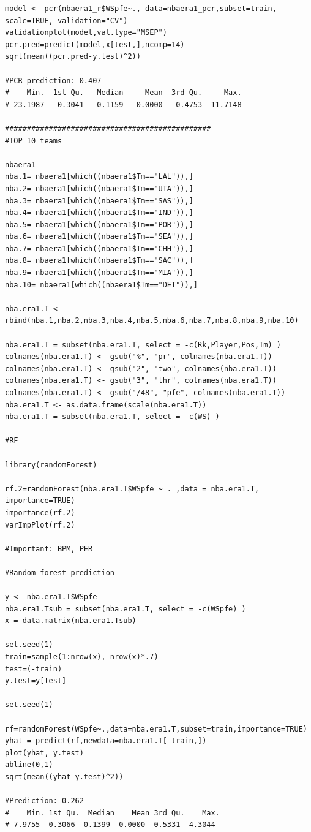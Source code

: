 \documentclass[11pt,letterpaper]{amsart}
\begin{document}
\begin{lstlisting}[breaklines]
model <- pcr(nbaera1_r$WSpfe~., data=nbaera1_pcr,subset=train, scale=TRUE, validation="CV")
validationplot(model,val.type="MSEP")
pcr.pred=predict(model,x[test,],ncomp=14)
sqrt(mean((pcr.pred-y.test)^2))

#PCR prediction: 0.407
#    Min.  1st Qu.   Median     Mean  3rd Qu.     Max. 
#-23.1987  -0.3041   0.1159   0.0000   0.4753  11.7148

###############################################
#TOP 10 teams

nbaera1
nba.1= nbaera1[which((nbaera1$Tm=="LAL")),]
nba.2= nbaera1[which((nbaera1$Tm=="UTA")),]
nba.3= nbaera1[which((nbaera1$Tm=="SAS")),]
nba.4= nbaera1[which((nbaera1$Tm=="IND")),]
nba.5= nbaera1[which((nbaera1$Tm=="POR")),]
nba.6= nbaera1[which((nbaera1$Tm=="SEA")),]
nba.7= nbaera1[which((nbaera1$Tm=="CHH")),]
nba.8= nbaera1[which((nbaera1$Tm=="SAC")),]
nba.9= nbaera1[which((nbaera1$Tm=="MIA")),]
nba.10= nbaera1[which((nbaera1$Tm=="DET")),]

nba.era1.T <- rbind(nba.1,nba.2,nba.3,nba.4,nba.5,nba.6,nba.7,nba.8,nba.9,nba.10)

nba.era1.T = subset(nba.era1.T, select = -c(Rk,Player,Pos,Tm) )
colnames(nba.era1.T) <- gsub("%", "pr", colnames(nba.era1.T))
colnames(nba.era1.T) <- gsub("2", "two", colnames(nba.era1.T))
colnames(nba.era1.T) <- gsub("3", "thr", colnames(nba.era1.T))
colnames(nba.era1.T) <- gsub("/48", "pfe", colnames(nba.era1.T))
nba.era1.T <- as.data.frame(scale(nba.era1.T))
nba.era1.T = subset(nba.era1.T, select = -c(WS) )

#RF

library(randomForest)

rf.2=randomForest(nba.era1.T$WSpfe ~ . ,data = nba.era1.T, importance=TRUE)
importance(rf.2)
varImpPlot(rf.2)

#Important: BPM, PER

#Random forest prediction

y <- nba.era1.T$WSpfe
nba.era1.Tsub = subset(nba.era1.T, select = -c(WSpfe) )
x = data.matrix(nba.era1.Tsub)

set.seed(1)
train=sample(1:nrow(x), nrow(x)*.7)
test=(-train)
y.test=y[test]

set.seed(1)

rf=randomForest(WSpfe~.,data=nba.era1.T,subset=train,importance=TRUE)
yhat = predict(rf,newdata=nba.era1.T[-train,])
plot(yhat, y.test)
abline(0,1)
sqrt(mean((yhat-y.test)^2))

#Prediction: 0.262
#    Min. 1st Qu.  Median    Mean 3rd Qu.    Max. 
#-7.9755 -0.3066  0.1399  0.0000  0.5331  4.3044 



\end{lstlisting}
\end{document}
